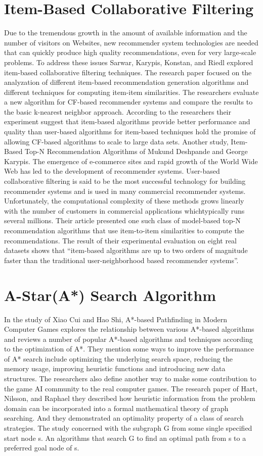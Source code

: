 \documentclass{report}
\begin{document}
\section{Item-Based Collaborative Filtering}
Due to the tremendous growth in the amount of available information and the number of
visitors on Websites, new recommender system technologies are needed that can quickly
produce high quality recommendations, even for very large-scale problems. To address these
issues Sarwar, Karypis, Konstan, and Riedl explored item-based collaborative filtering
techniques. The research paper focused on the analyzation of different item-based
recommendation generation algorithms and different techniques for computing item-item
similarities. The researchers evaluate a new algorithm for CF-based recommender systems and
compare the results to the basic k-nearest neighbor approach. According to the researchers
their experiment suggest that item-based algorithms provide better performance and quality
than user-based algorithms for item-based techniques hold the promise of allowing CF-based
algorithms to scale to large data sets.
Another study, Item-Based Top-N Recommendation Algorithms of Mukund Deshpande
and George Karypis. The emergence of e-commerce sites and rapid growth of the World Wide
Web has led to the development of recommender systems. User-based collaborative filtering is
said to be the most successful technology for building recommender systems and is used in
many commercial recommender systems. Unfortunately, the computational complexity of
these methods grows linearly with the number of customers in commercial applications whichtypically runs several millions. Their article presented one such class of model-based top-N
recommendation
algorithms
that
use
item-to-item
similarities
to
compute
the
recommendations. The result of their experimental evaluation on eight real datasets shows that
“item-based algorithms are up to two orders of magnitude faster than the traditional
user-neighborhood based recommender systems”.

\section{A-Star(A*) Search Algorithm}
In the study of Xiao Cui and Hao Shi, A*-based Pathfinding in Modern Computer Games
explores the relationship between various A*-based algorithms and reviews a number of
popular A*-based algorithms and techniques according to the optimization of A*. They mention
some ways to improve the performance of A* search include optimizing the underlying search
space, reducing the memory usage, improving heuristic functions and introducing new data
structures. The researchers also define another way to make some contribution to the game AI
community to the real computer games.
The research paper of Hart, Nilsson, and Raphael they described how heuristic
information from the problem domain can be incorporated into a formal mathematical theory
of graph searching. And they demonstrated an optimality property of a class of search
strategies. The study concerned with the subgraph G from some single specified start node s.
An algorithms that search G to find an optimal path from s to a preferred goal node of s.
\end{document}
